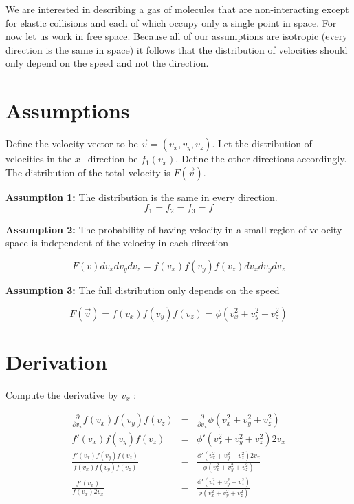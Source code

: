 \documentclass[12pt]{book}
\begin{document}
We are interested in describing a gas of molecules that are non-interacting except for elastic collisions and
each of which occupy only a single point in space. For now let us work in free space. Because all of our
assumptions are isotropic (every direction is the same in space) it follows that the distribution of velocities should only depend on the speed and
not the direction.

\section{Assumptions}

Define the velocity vector to be $\vec{v} = (v_x , v_y , v_z ).$ Let the distribution of velocities in the $x$−direction be
$f_1(v_x).$ Define the other directions accordingly. The distribution of the total velocity is $F (\vec{v}).$

{\bf Assumption 1:} The distribution is the same in every direction. 
\begin{equation*}
 f_1 = f_2 = f_3 = f
\end{equation*}

{\bf Assumption 2:} The probability of having velocity in a small region of velocity space is independent of the
velocity in each direction

\begin{equation*}
 F (v)dv_x dv_y dv_z = f (v_x )f (v_y )f (v_z )dv_x dv_y dv_z
\end{equation*}

{\bf Assumption 3:} The full distribution only depends on the speed

\begin{equation*}
F (\vec{v}) = f (v_x )f (v_y )f (v_z ) = \phi(v_x^2 + v_y^2 + v_z^2 )
\end{equation*}

\section{Derivation}

Compute the derivative by $v_x$ :

\begin{eqnarray*}
    \frac{\partial}{\partial v_x} f(v_x)f(v_y)f(v_z) &=& \frac{\partial}{\partial v_x} \phi( v_x^2 + v_y^2 + v_z^2 ) \\
    f'(v_x)f(v_y)f(v_z) &=& \phi'( v_x^2 + v_y^2 + v_z^2 )2v_x \\
    \frac{f'(v_x)f(v_y)f(v_z)}{f(v_x)f(v_y)f(v_z)}&=& \frac{\phi'( v_x^2 + v_y^2 + v_z^2 )2v_x}{\phi(v_x^2 + v_y^2 + v_z^2 )} \\
    \frac{f'(v_x)}{f(v_x)2v_x}&=& \frac{\phi'( v_x^2 + v_y^2 + v_z^2 )}{\phi(v_x^2 + v_y^2 + v_z^2 )}
\end{eqnarray*}
\end{document}
